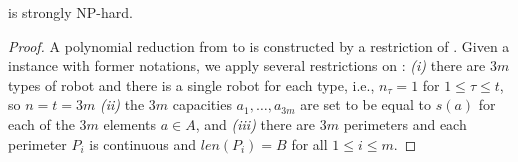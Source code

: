 \begin{theorem}\label{t:opglr-hard}
	\opglr is strongly NP-hard. 
\end{theorem}
\begin{proof}
	A polynomial reduction from \tpart to \opglrd is constructed
	by a restriction of \opglrd. Given a \tpart instance with former notations,
	we apply several restrictions on \opglrd: {\em (i)} there are $3m$ types of robot
	and there is a single robot 
	for each type, i.e., $n_{\tau} = 1$ for $1 \le \tau \le t$, so $n=t=3m$ 
	{\em (ii)} the $3m$ capacities $a_1, \ldots, a_{3m}$ are set to be equal to
	$s(a)$ for each of the $3m$ elements $a\in A$, and {\em (iii)} 
	there are $3m$ perimeters and each perimeter $P_i$ is continuous and
	$len(P_i)=B$ for all $1 \le i \le m$.

	

	

\end{proof}
